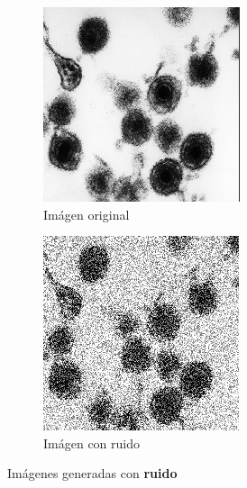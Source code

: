 \documentclass{uc3mpracticas}
\begin{document}
  \begin{figure}[!h]

    \hspace{0.16\textwidth}
    \begin{subfigure}[H]{0.25\textwidth}
      \includegraphics[width=\textwidth, frame]{Images/og.png}
      \caption{Imágen original}
    \end{subfigure}
    \hspace{0.16\textwidth}
    \begin{subfigure}[H]{0.25\textwidth}
      \includegraphics[width=\textwidth, frame]{Images/noise.png}
      \caption{Imágen con ruido}
    \end{subfigure}

    \caption{Imágenes generadas con \textbf{ruido}}
  \end{figure}
\end{document}
